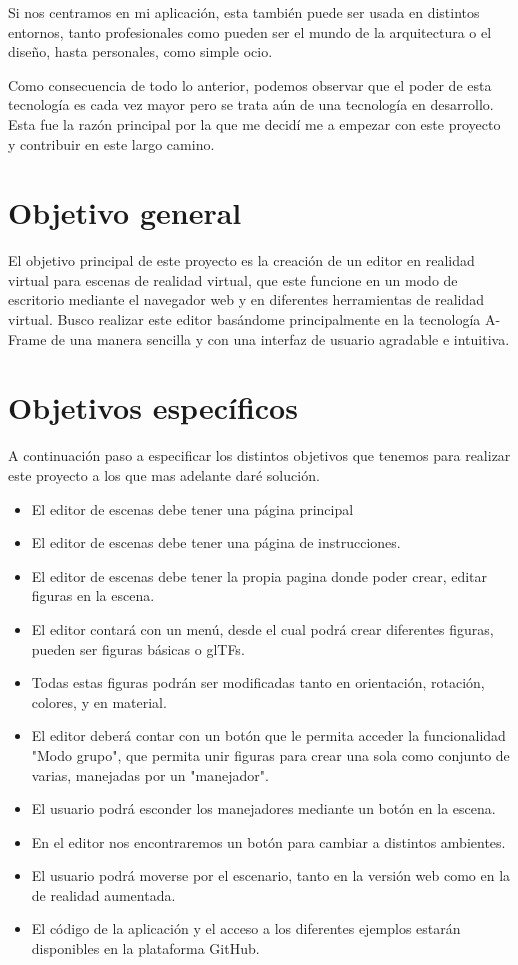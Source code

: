 \documentclass[a4paper, 12pt]{book}
\begin{document}
Si nos centramos en mi aplicación, esta también puede ser usada en distintos entornos, tanto profesionales como pueden ser el mundo de la arquitectura o el diseño, hasta personales, como simple ocio.

Como consecuencia de todo lo anterior, podemos observar que el poder de esta tecnología es cada vez mayor pero se trata aún de una tecnología en desarrollo. Esta fue la razón principal por la que me decidí me a empezar con este proyecto y contribuir en este largo camino.

\section{Objetivo general}
\label{sec:objetivo general}

El objetivo principal de este proyecto es la creación de un editor en realidad virtual para escenas de realidad virtual, que este funcione en un modo de escritorio mediante el navegador web y en diferentes herramientas de realidad virtual. Busco realizar este editor basándome principalmente en la tecnología A-Frame de una manera sencilla y con una interfaz de usuario agradable e intuitiva.

\section{Objetivos específicos}
\label{sec:Objetivos específicos}

A continuación paso a especificar los distintos objetivos que tenemos para realizar este proyecto a los que mas adelante daré solución. 

\begin{itemize}
  \item El editor de escenas debe tener una página principal
  \item El editor de escenas debe tener una página de instrucciones.
  \item El editor de escenas debe tener la propia pagina donde poder crear, editar figuras en la escena.
  \item El editor contará con un menú, desde el cual podrá crear diferentes figuras, pueden ser figuras básicas o glTFs.
  \item Todas estas figuras podrán ser modificadas tanto en orientación, rotación, colores, y en material.
  \item El editor deberá contar con un botón que le permita acceder la funcionalidad "Modo grupo", que permita unir figuras para crear una sola como conjunto de varias, manejadas por un "manejador".
  \item El usuario podrá esconder los manejadores mediante un botón en la escena.  
  \item En el editor nos encontraremos un botón para cambiar a distintos ambientes.
  \item El usuario podrá moverse por el escenario, tanto en la versión web como en la de realidad aumentada.
  \item El código de la aplicación y el acceso a los diferentes ejemplos estarán disponibles en la plataforma GitHub.
\end{itemize}
\end{document}
